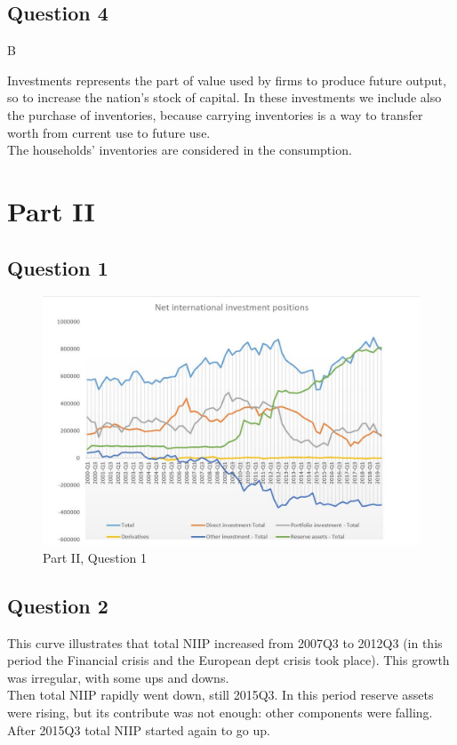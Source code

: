 \documentclass[
	12pt, %
]{fphw}
\begin{document}
\section*{Question 4}
B \\ 
\par Investments represents the part of value used by firms to produce future output, so to increase the nation's stock of capital. In these investments we include also the purchase of inventories, because carrying inventories is a way to transfer worth from current use to future use. \\
The households' inventories are considered in the consumption.  \\

\newpage
\chapter{Part II}
\section*{Question 1}
\begin{figure}[h]
\centering 
\includegraphics[scale=0.7]{ass1es2pt1.JPG} 
\caption{Part II, Question 1} 
\end{figure}


\section*{Question 2}
This curve illustrates that total NIIP increased from 2007Q3 to 2012Q3 (in this period the Financial crisis and the European dept crisis took place). This growth was irregular, with some ups and downs. \\Then total NIIP rapidly went down, still 2015Q3. In this period reserve assets were rising, but its contribute was not enough: other components were falling. \\
After 2015Q3 total NIIP started again to go up.
\end{document}
